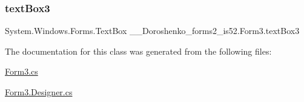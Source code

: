 \hypertarget{class__7___doroshenko__forms2__is52_1_1_form3_a66deab25b9348663a1c13b0a3cafc3b8}{}\label{class__7___doroshenko__forms2__is52_1_1_form3_a66deab25b9348663a1c13b0a3cafc3b8} 
\subsubsection{\texorpdfstring{text\+Box3}{textBox3}}
{\footnotesize\ttfamily System.\+Windows.\+Forms.\+Text\+Box \+\_\+\_\+\+Doroshenko\+\_\+forms2\+\_\+is52.\+Form3.\+text\+Box3\hspace{0.3cm}{\ttfamily [package]}}



The documentation for this class was generated from the following files\+:\begin{DoxyCompactItemize}
\item 
\hyperlink{_form3_8cs}{Form3.\+cs}\item 
\hyperlink{_form3_8_designer_8cs}{Form3.\+Designer.\+cs}\end{DoxyCompactItemize}
